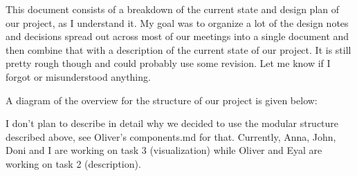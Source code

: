 \documentclass[12pt]{article}
\begin{document}
This document consists of a breakdown of the current state and design plan of our project, as I understand it. My goal was to organize a lot of the design notes and decisions spread out across most of our meetings into a single document and then combine that with a description of the current state of our project. It is still pretty rough though and could probably use some revision. Let me know if I forgot or misunderstood anything.

A diagram of the overview for the structure of our project is given below:
\begin{center}
\end{center}

I don't plan to describe in detail why we decided to use the modular structure described above, see Oliver's components.md for that. Currently, Anna, John, Doni and I are working on task 3 (visualization) while Oliver and Eyal are working on task 2 (description).
\end{document}
